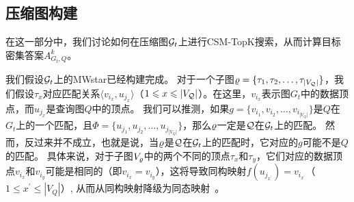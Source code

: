\subsection{压缩图构建}
在这一部分中，我们讨论如何在压缩图$\mathcal{G}_t$上进行CSM-TopK搜索，从而计算目标密集答案$A_{G_t, Q}^k$。

我们假设$\mathcal{G}_t$上的MWstar已经构建完成。
对于一个子图$\varrho = \{\tau_1, \tau_2, \dots, \tau_{|V_{\mathcal{Q}}|}\}$，我们假设$\tau_x$对应匹配关系$\langle v_{i_x}, u_{j_x} \rangle$（$1 \leqslant x \leqslant |V_{\mathcal{Q}}|$）。在这里，$v_{i_x}$表示图$G_t$中的数据顶点，而$u_{j_x}$是查询图$Q$中的顶点。
我们可以推测，如果$g = \{v_{i_1}, v_{i_2}, \dots, v_{i_{|V_Q|}}\}$是$Q$在$G_t$上的一个匹配，且$\Phi = \{u_{j_1}, u_{j_2}, \dots, u_{j_{|V_Q|}}\}$，那么$\varrho$一定是$\mathcal{Q}$在$\mathcal{G}_t$上的匹配。
然而，反过来并不成立，也就是说，当$\varrho$是$\mathcal{Q}$在$\mathcal{G}_t$上的匹配时，它对应的$g$可能不是$Q$的匹配。
具体来说，对于子图$V_{\varrho}$中的两个不同的顶点$\tau_x$和$\tau_y$，它们对应的数据顶点$v_{i_x}$和$v_{i_y}$可能是相同的（即$v_{i_x} = v_{i_y}$），这将导致同构映射$f(u_{j_{x^\prime}}) = v_{i_{x^\prime}}$（$1 \leq x^\prime \leq |V_Q|$）, 从而从同构映射降级为同态映射~\cite{homomorphism-DBLP:conf/soda/CyganFGKMPS16}。

